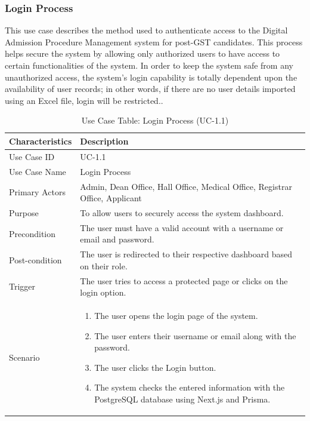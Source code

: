 \subsubsection{Login Process}

This use case describes the method used to authenticate access to the Digital Admission Procedure Management system for post-GST candidates. This process helps secure the system by allowing only authorized users to have access to certain functionalities of the system. In order to keep the system safe from any unauthorized access, the system’s login capability is totally dependent upon the availability of user records; in other words, if there are no user details imported using an Excel file, login will be restricted..

\begin{table}[H]
    \centering
    \small
    \renewcommand{\arraystretch}{1.5}
    \caption{Use Case Table: Login Process (UC-1.1)} %
    \label{tab:use_case_login}
    \begin{tabularx}{\textwidth}{|l|X|}
        \hline
        \rowcolor[gray]{0.9} {Characteristics} & {Description} \\ \hline
        Use Case ID & UC-1.1 \\ \hline
        Use Case Name & Login Process \\ \hline
        Primary Actors & Admin, Dean Office, Hall Office, Medical Office, Registrar Office, Applicant \\ \hline
        Purpose & To allow users to securely access the system dashboard. \\ \hline
        Precondition & The user must have a valid account with a username or email and password. \\ \hline
        Post-condition & The user is redirected to their respective dashboard based on their role. \\ \hline
        Trigger & The user tries to access a protected page or clicks on the login option. \\ \hline
        Scenario & 
        \begin{enumerate}[nosep, leftmargin=*]
            \item The user opens the login page of the system.
            \item The user enters their username or email along with the password.
            \item The user clicks the Login button.
            \item The system checks the entered information with the PostgreSQL database using Next.js and Prisma.

\end{enumerate}
\end{tabularx}
\end{table}
